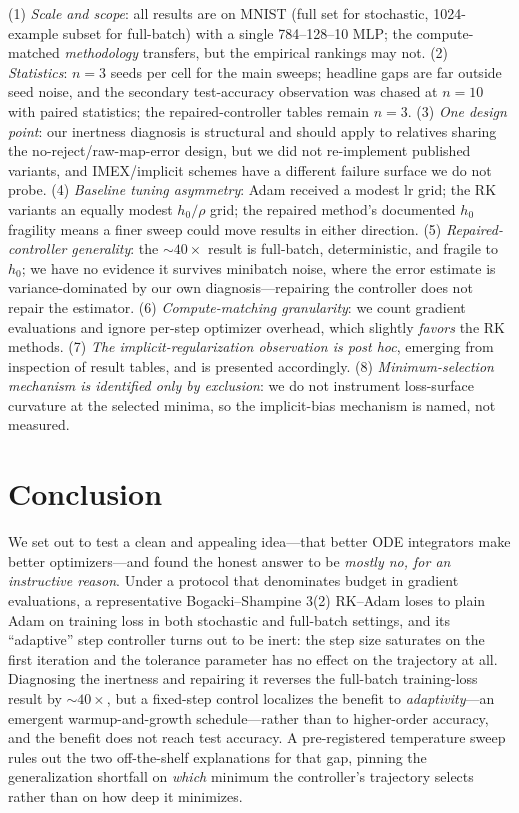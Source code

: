 \documentclass{article}
\begin{document}
(1) \emph{Scale and scope}: all results are on MNIST (full set for stochastic, 1024-example subset for full-batch) with a single 784--128--10 MLP; the compute-matched \emph{methodology} transfers, but the empirical rankings may not. (2) \emph{Statistics}: $n{=}3$ seeds per cell for the main sweeps; headline gaps are far outside seed noise, and the secondary test-accuracy observation was chased at $n{=}10$ with paired statistics; the repaired-controller tables remain $n{=}3$. (3) \emph{One design point}: our inertness diagnosis is structural and should apply to relatives sharing the no-reject/raw-map-error design, but we did not re-implement published variants, and IMEX/implicit schemes have a different failure surface we do not probe. (4) \emph{Baseline tuning asymmetry}: Adam received a modest lr grid; the RK variants an equally modest $h_0/\rho$ grid; the repaired method's documented $h_0$ fragility means a finer sweep could move results in either direction. (5) \emph{Repaired-controller generality}: the ${\sim}40\times$ result is full-batch, deterministic, and fragile to $h_0$; we have no evidence it survives minibatch noise, where the error estimate is variance-dominated by our own diagnosis---repairing the controller does not repair the estimator. (6) \emph{Compute-matching granularity}: we count gradient evaluations and ignore per-step optimizer overhead, which slightly \emph{favors} the RK methods. (7) \emph{The implicit-regularization observation is post hoc}, emerging from inspection of result tables, and is presented accordingly. (8) \emph{Minimum-selection mechanism is identified only by exclusion}: we do not instrument loss-surface curvature at the selected minima, so the implicit-bias mechanism is named, not measured.

\section{Conclusion}
\label{sec:conclusion}

We set out to test a clean and appealing idea---that better ODE integrators make better optimizers---and found the honest answer to be \emph{mostly no, for an instructive reason}. Under a protocol that denominates budget in gradient evaluations, a representative Bogacki--Shampine 3(2) RK--Adam loses to plain Adam on training loss in both stochastic and full-batch settings, and its ``adaptive'' step controller turns out to be inert: the step size saturates on the first iteration and the tolerance parameter has no effect on the trajectory at all. Diagnosing the inertness and repairing it reverses the full-batch training-loss result by ${\sim}40\times$, but a fixed-step control localizes the benefit to \emph{adaptivity}---an emergent warmup-and-growth schedule---rather than to higher-order accuracy, and the benefit does not reach test accuracy. A pre-registered temperature sweep rules out the two off-the-shelf explanations for that gap, pinning the generalization shortfall on \emph{which} minimum the controller's trajectory selects rather than on how deep it minimizes.
\end{document}
